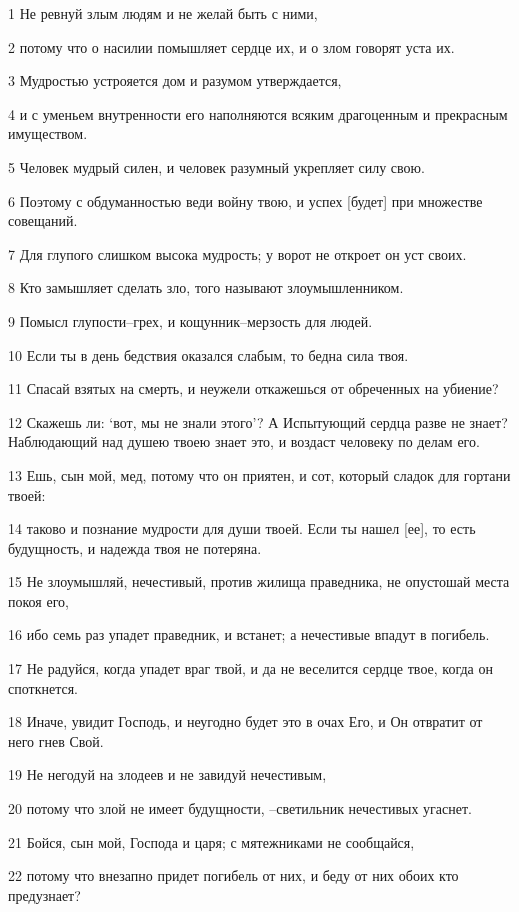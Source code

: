 \par 1 Не ревнуй злым людям и не желай быть с ними,
\par 2 потому что о насилии помышляет сердце их, и о злом говорят уста их.
\par 3 Мудростью устрояется дом и разумом утверждается,
\par 4 и с уменьем внутренности его наполняются всяким драгоценным и прекрасным имуществом.
\par 5 Человек мудрый силен, и человек разумный укрепляет силу свою.
\par 6 Поэтому с обдуманностью веди войну твою, и успех [будет] при множестве совещаний.
\par 7 Для глупого слишком высока мудрость; у ворот не откроет он уст своих.
\par 8 Кто замышляет сделать зло, того называют злоумышленником.
\par 9 Помысл глупости--грех, и кощунник--мерзость для людей.
\par 10 Если ты в день бедствия оказался слабым, то бедна сила твоя.
\par 11 Спасай взятых на смерть, и неужели откажешься от обреченных на убиение?
\par 12 Скажешь ли: `вот, мы не знали этого'? А Испытующий сердца разве не знает? Наблюдающий над душею твоею знает это, и воздаст человеку по делам его.
\par 13 Ешь, сын мой, мед, потому что он приятен, и сот, который сладок для гортани твоей:
\par 14 таково и познание мудрости для души твоей. Если ты нашел [ее], то есть будущность, и надежда твоя не потеряна.
\par 15 Не злоумышляй, нечестивый, против жилища праведника, не опустошай места покоя его,
\par 16 ибо семь раз упадет праведник, и встанет; а нечестивые впадут в погибель.
\par 17 Не радуйся, когда упадет враг твой, и да не веселится сердце твое, когда он споткнется.
\par 18 Иначе, увидит Господь, и неугодно будет это в очах Его, и Он отвратит от него гнев Свой.
\par 19 Не негодуй на злодеев и не завидуй нечестивым,
\par 20 потому что злой не имеет будущности, --светильник нечестивых угаснет.
\par 21 Бойся, сын мой, Господа и царя; с мятежниками не сообщайся,
\par 22 потому что внезапно придет погибель от них, и беду от них обоих кто предузнает?
